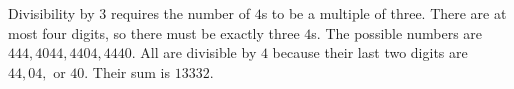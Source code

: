Divisibility by $3$ requires the number of $4$s to be a multiple of three. There are at most four digits, so there must be exactly three $4$s. The possible numbers are $444,4044,4404,4440$. All are divisible by $4$ because their last two digits are $44,04,$ or $40$. Their sum is $\boxed{13332}$.
